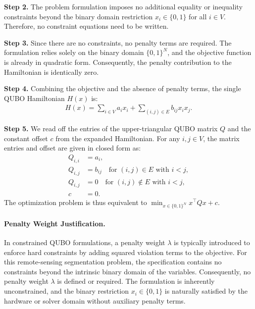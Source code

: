 \documentclass[12pt]{article}
\begin{document}
\textbf{Step 2.} The problem formulation imposes no additional equality or inequality constraints beyond the binary domain restriction $x_i \in \{0,1\}$ for all $i \in V$. Therefore, no constraint equations need to be written.

\textbf{Step 3.} Since there are no constraints, no penalty terms are required. The formulation relies solely on the binary domain $\{0,1\}^N$, and the objective function is already in quadratic form. Consequently, the penalty contribution to the Hamiltonian is identically zero.

\textbf{Step 4.} Combining the objective and the absence of penalty terms, the single QUBO Hamiltonian $H(x)$ is:
\begin{align}
  H(x) = \sum_{i \in V} a_i x_i + \sum_{(i,j) \in E} b_{ij} x_i x_j.
\end{align}

\textbf{Step 5.} We read off the entries of the upper-triangular QUBO matrix $Q$ and the constant offset $c$ from the expanded Hamiltonian. For any $i, j \in V$, the matrix entries and offset are given in closed form as:
\begin{align}
  Q_{i,i} &= a_i, \\
  Q_{i,j} &= b_{ij} \quad \text{for } (i,j) \in E \text{ with } i < j, \\
  Q_{i,j} &= 0 \quad \text{for } (i,j) \notin E \text{ with } i < j, \\
  c &= 0.
\end{align}
The optimization problem is thus equivalent to $\min_{x \in \{0,1\}^N} x^\top Q x + c$.

\paragraph{Penalty Weight Justification.}
In constrained QUBO formulations, a penalty weight $\lambda$ is typically introduced to enforce hard constraints by adding squared violation terms to the objective. For this remote-sensing segmentation problem, the specification contains no constraints beyond the intrinsic binary domain of the variables. Consequently, no penalty weight $\lambda$ is defined or required. The formulation is inherently unconstrained, and the binary restriction $x_i \in \{0,1\}$ is naturally satisfied by the hardware or solver domain without auxiliary penalty terms.
\end{document}
